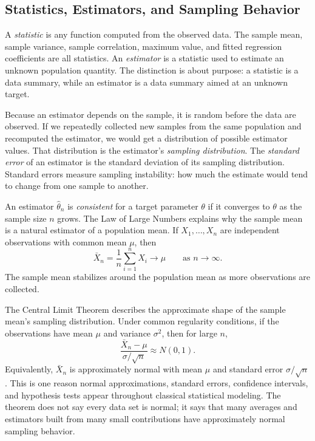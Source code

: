 {\subsection{Statistics, Estimators, and Sampling Behavior}

A \emph{statistic} is any function computed from the observed data.  The sample mean, sample variance, sample correlation, maximum value, and fitted regression coefficients are all statistics.  An \emph{estimator} is a statistic used to estimate an unknown population quantity.  The distinction is about purpose: a statistic is a data summary, while an estimator is a data summary aimed at an unknown target.

Because an estimator depends on the sample, it is random before the data are observed.  If we repeatedly collected new samples from the same population and recomputed the estimator, we would get a distribution of possible estimator values.  That distribution is the estimator's \emph{sampling distribution}.  The \emph{standard error} of an estimator is the standard deviation of its sampling distribution.  Standard errors measure sampling instability: how much the estimate would tend to change from one sample to another.

An estimator \(\widehat{\theta}_n\) is \emph{consistent} for a target parameter \(\theta\) if it converges to \(\theta\) as the sample size \(n\) grows.  The Law of Large Numbers explains why the sample mean is a natural estimator of a population mean.  If \(X_1,\ldots,X_n\) are independent observations with common mean \(\mu\), then
\begin{equation}
  \bar{X}_n=\frac{1}{n}\sum_{i=1}^n X_i
  \longrightarrow \mu
  \qquad \text{as } n\to\infty.
  \label{eq:law-large-numbers}
\end{equation}
The sample mean stabilizes around the population mean as more observations are collected.

The Central Limit Theorem describes the approximate shape of the sample mean's sampling distribution.  Under common regularity conditions, if the observations have mean \(\mu\) and variance \(\sigma^2\), then for large \(n\),
\begin{equation}
  \frac{\bar{X}_n-\mu}{\sigma/\sqrt{n}}
  \approx N(0,1).
  \label{eq:central-limit-theorem}
\end{equation}
Equivalently, \(\bar{X}_n\) is approximately normal with mean \(\mu\) and standard error \(\sigma/\sqrt{n}\).  This is one reason normal approximations, standard errors, confidence intervals, and hypothesis tests appear throughout classical statistical modeling.  The theorem does not say every data set is normal; it says that many averages and estimators built from many small contributions have approximately normal sampling behavior.

}
